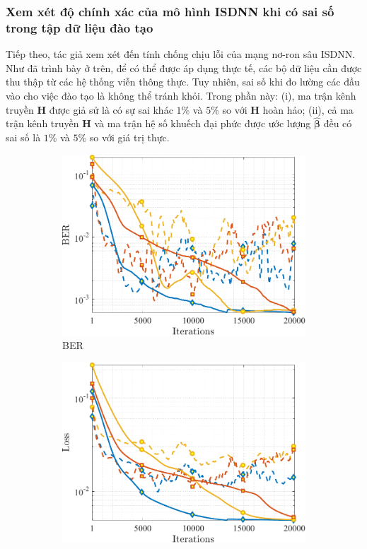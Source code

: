 \subsubsection{Xem xét độ chính xác của mô hình ISDNN khi có sai số trong tập dữ liệu đào tạo}
Tiếp theo, tác giả xem xét đến tính chống chịu lỗi của mạng nơ-ron sâu ISDNN. Như đã trình bày ở trên, để có thể được áp dụng thực tế, các bộ dữ liệu cần được thu thập từ các hệ thống viễn thông thực. Tuy nhiên, sai số khi đo lường các đầu vào cho việc đào tạo là không thể tránh khỏi. Trong phần này: (i), ma trận kênh truyền $\mathbf{H}$ được giả sử là có sự sai khác $1$\% và $5$\% so với $\mathbf{H}$ hoàn hảo; (ii), cả ma trận kênh truyền $\mathbf{H}$ và ma trận hệ số khuếch đại phức được ước lượng $\hat{\boldsymbol{\beta}}$ đều có sai số là $1$\% và $5$\% so với giá trị thực. 
\begin{figure}[ht]
    \centering
    \begin{subfigure}[b]{0.48\textwidth}
        \centering
        \includegraphics[width=\textwidth]{figures/Loss_22.pdf}
        \caption{BER}
        \label{fig:ber_2}
    \end{subfigure}
    \hfill
    \begin{subfigure}[b]{0.48\textwidth}
        \centering
        \includegraphics[width=\textwidth]{figures/BER_22.pdf}

\end{subfigure}
\end{figure}
